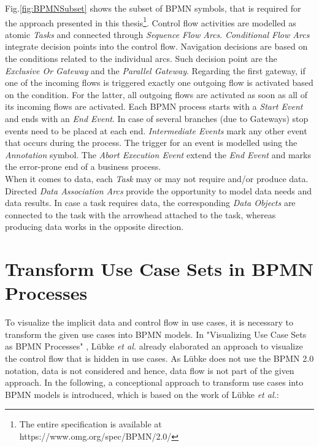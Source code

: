 \noindent
Fig.\ref{fig:BPMNSubset} shows the subset of BPMN symbols, that is required for the approach presented in this thesis\footnote{The entire specification is available at https://www.omg.org/spec/BPMN/2.0/}. Control flow activities are modelled as atomic \textit{Tasks} and connected through \textit{Sequence Flow Arcs}. \textit{Conditional Flow Arcs} integrate decision points into the control flow. Navigation decisions are based on the conditions related to the individual arcs. Such decision point are the \textit{Exclusive Or Gateway} and the \textit{Parallel Gateway}. Regarding the first gateway, if one of the incoming flows is triggered exactly one outgoing flow is activated based on the condition. For the latter, all outgoing flows are activated as soon as all of its incoming flows are activated. Each BPMN process starts with a \textit{Start Event} and ends with an \textit{End Event}. In case of several branches (due to Gateways) stop events need to be placed at each end. \textit{Intermediate Events} mark any other event that occurs during the process. The trigger for an event is modelled using the \textit{Annotation} symbol. The \textit{Abort Execution Event} extend the \textit{End Event} and marks the error-prone end of a business process. \\
When it comes to data, each \textit{Task} may or may not require and/or produce data. Directed \textit{Data Association Arcs} provide the opportunity to model data needs and data results. In case a task requires data, the corresponding \textit{Data Objects} are connected to the task with the arrowhead attached to the task, whereas producing data works in the opposite direction. \\


\section{Transform Use Case Sets in BPMN Processes}
\label{sec:PrepApproach:TransformUCtoBPMN}
To visualize the implicit data and control flow in use cases, it is necessary to transform the given use cases into BPMN models. In "Visualizing Use Case Sets as BPMN Processes" \cite{VisualizeBPMN}, Lübke \textit{et al.} already elaborated an approach to visualize the control flow that is hidden in use cases. As Lübke does not use the BPMN 2.0 notation, data is not considered and hence, data flow is not part of the given approach. In the following, a conceptional approach to transform use cases into BPMN models is introduced, which is based on the work of Lübke \textit{et al.}\cite{VisualizeBPMN}:



